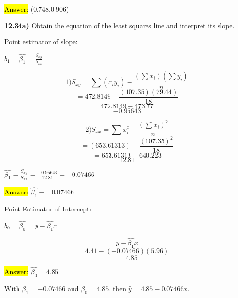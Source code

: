 \documentclass{article}
\begin{document}
 \vspace{2mm}


\hl{Answer:} (0.748,0.906)








\newpage
\textbf{12.34a)} Obtain the equation of the least squares line and interpret its slope.


\vspace{2mm}


Point estimator of slope:

\vspace{2mm}

$b_{1}=\hat{\beta_{1}}=\frac{S_{xy}}{S_{xx}}$ 

\vspace{2mm}

$$1) S_{xy}=\sum (x_{i}y_{i})-\frac{(\sum x_{i})(\sum y_{i})}{n}$$
$$=472.8149-\frac{(107.35)(79.44)}{18}$$
$$472.8149-473.77$$
$$-0.95643$$



$$2) S_{xx}= \sum x_{i}^{2}-\frac{(\sum x_{i})^{2}}{n}$$
$$=(653.61313)-\frac{(107.35)^{2}}{18}$$
$$=653.61313-640.223$$
$$12.81$$


$\hat{\beta_{1}}=\frac{S_{xy}}{S_{xx}}=\frac{-0.95643}{12.81}=-0.07466$


\vspace{2mm}

\hl{Answer:} $\hat{\beta_{1}}=-0.07466$

\vspace{2mm}


Point Estimator of Intercept:

\vspace{2mm}

$b_{0}=\hat{\beta_{0}}=\overline{y}-\hat{\beta_{1}}\overline{x}$

\vspace{2mm}

$$\overline{y}-\hat{\beta_{1}}\overline{x}$$
$$4.41-(-0.07466)(5.96)$$
$$=4.85$$

\vspace{2mm}


\hl{Answer:} $\hat{\beta_{0}}=4.85$

\vspace{2mm}


With $\hat{\beta_{1}}=-0.07466$ and $\hat{\beta_{0}}=4.85$, then $\hat{y}=4.85-0.07466x$.
\end{document}
